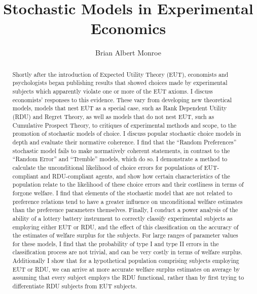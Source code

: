 \documentclass[11pt,a4paper,notitlepage]{report}
\title{Stochastic Models in Experimental Economics}
\author{Brian Albert Monroe}
\begin{document}
\maketitle{}

\doublespacing

\begin{abstract}

Shortly after the introduction of Expected Utility Theory (EUT), economists and psychologists began publishing results that showed choices made by experimental subjects which apparently violate one or more of the EUT axioms.
I discuss economists' responses to this evidence.
These vary from developing new theoretical models, models that nest EUT as a special case, such as Rank Dependent Utility (RDU) and Regret Theory, as well as models that do not nest EUT, such as Cumulative Prospect Theory, to critiques of experimental methods and scope, to the promotion of stochastic models of choice.
I discuss popular stochastic choice models in depth and evaluate their normative coherence.
I find that the \enquote{Random Preferences} stochastic model fails to make normatively coherent statements, in contrast to the \enquote{Random Error} and \enquote{Tremble} models, which do so.
I demonstrate a method to calculate the unconditional likelihood of choice errors for populations of EUT-compliant and RDU-compliant agents, and show how certain characteristics of the population relate to the likelihood of these choice errors and their costliness in terms of forgone welfare.
I find that elements of the stochastic model that are not related to preference relations tend to have a greater influence on unconditional welfare estimates than the preference parameters themselves.
Finally, I conduct a power analysis of the ability of a lottery battery instrument to correctly classify experimental subjects as employing either EUT or RDU, and the effect of this classification on the accuracy of the estimates of welfare surplus for the subjects.
For large ranges of parameter values for these models, I find that the probability of type I and type II errors in the classification process are not trivial, and can be very costly in terms of welfare surplus.
Additionally I show that for a hypothetical population comprising subjects employing EUT or RDU, we can arrive at more accurate welfare surplus estimates on average by assuming that every subject employs the RDU functional, rather than by first trying to differentiate RDU subjects from EUT subjects.

\end{abstract}
\end{document}
